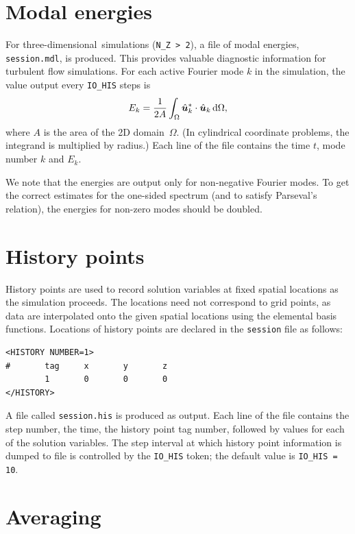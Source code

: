 \documentclass[11pt]{report}
\newcommand\threed{three-di\-men\-sion\-al}
\begin{document}
\section{Modal energies}
\label{sec.modal}

For \threed\ simulations (\verb+N_Z > 2+), a file of modal energies,
\verb+session.mdl+, is produced.  This provides valuable diagnostic
information for turbulent flow simulations.  For each active Fourier
mode $k$ in the simulation, the value output every \verb+IO_HIS+ steps
is 
\[
E_k =
\frac{1}{2A}\int_\Omega
\hat{\bm{u}}_k^\ast\cdot\hat{\bm{u}}_k \,{\rm d}\Omega,
\]
where $A$ is the area of the 2D domain~$\Omega$.  (In cylindrical
coordinate problems, the integrand is multiplied by radius.) Each line
of the file contains the time $t$, mode number $k$ and $E_k$.

We note that the energies are output only for non-negative Fourier
modes.  To get the correct estimates for the one-sided spectrum (and
to satisfy Parseval's relation), the energies for non-zero modes
should be doubled.

\section{History points}
\label{sec.history}

History points are used to record solution variables at fixed spatial
locations as the simulation proceeds.  The locations need not
correspond to grid points, as data are interpolated onto the given
spatial locations using the elemental basis functions.  Locations of
history points are declared in the \verb+session+ file as follows:
%
{\small
\begin{verbatim}
<HISTORY NUMBER=1>
#       tag     x       y       z 
        1       0       0       0
</HISTORY>
\end{verbatim}
}
%
A file called \verb+session.his+ is produced as output.  Each line of
the file contains the step number, the time, the history point tag
number, followed by values for each of the solution variables.  The
step interval at which history point information is dumped to file is
controlled by the \verb+IO_HIS+ token; the default value is
\verb+IO_HIS = 10+.

\section{Averaging}
\label{sec.average}
\end{document}
